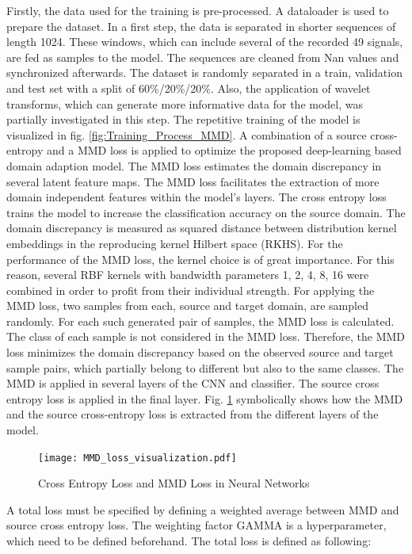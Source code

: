 Firstly, the data used for the training is pre-processed. A dataloader is used to prepare the dataset. In a first step, the data is separated in shorter sequences of length 1024. These windows, which can include several of the recorded 49 signals, are fed as samples to the model. The sequences are cleaned from Nan values and synchronized afterwards. The dataset is randomly separated in a train, validation and test set with a split of 60\%/20\%/20\%. Also, the application of wavelet transforms, which can generate more informative data for the model, was partially investigated in this step. The repetitive training of the model is visualized in fig. \ref{fig:Training_Process_MMD}. A combination of a source cross-entropy and a MMD loss is applied to optimize the proposed deep-learning based domain adaption model. The MMD loss estimates the domain discrepancy in several latent feature maps. The MMD loss facilitates the extraction of more domain independent features within the model's layers. The cross entropy loss trains the model to increase the classification accuracy on the source domain. The domain discrepancy is measured as squared distance between distribution kernel embeddings in the reproducing kernel Hilbert space (RKHS). For the performance of the MMD loss, the kernel choice is of great importance. For this reason, several RBF kernels with bandwidth parameters 1, 2, 4, 8, 16 were combined in order to profit from their individual strength. For applying the MMD loss, two samples from each, source and target domain, are sampled randomly. For each such generated pair of samples, the MMD loss is calculated. The class of each sample is not considered in the MMD loss. Therefore, the MMD loss minimizes the domain discrepancy based on the observed source and target sample pairs, which partially belong to different but also to the same classes. The MMD is applied in several layers of the CNN and classifier. The source cross entropy loss is applied in the final layer. Fig. \ref{fig:MMD_Loss_and_CE_loss} symbolically shows how the MMD and the source cross-entropy loss is extracted from the different layers of the model.

\begin{figure}[H]
  \centering
  \texttt{[image: MMD\_loss\_visualization.pdf]}
  \caption {Cross Entropy Loss and MMD Loss in Neural Networks} \label{fig:MMD_Loss_and_CE_loss}
\end{figure}
 
A total loss must be specified by defining a weighted average between MMD and source cross entropy loss. The weighting factor GAMMA is a hyperparameter, which need to be defined beforehand. The total loss is defined as following:

